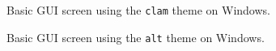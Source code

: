 \documentclass[a4paper]{article}
\begin{document}
\begin{figure}
\label{hercules-gui-basicscreen-clam}
\noindent{}
\caption{Basic GUI screen using the \texttt{clam} theme on Windows.}
\end{figure}
\begin{figure}
\label{hercules-gui-basicscreen-alt}
\noindent{}
\caption{Basic GUI screen using the \texttt{alt} theme on Windows.}
\end{figure}
\end{document}
